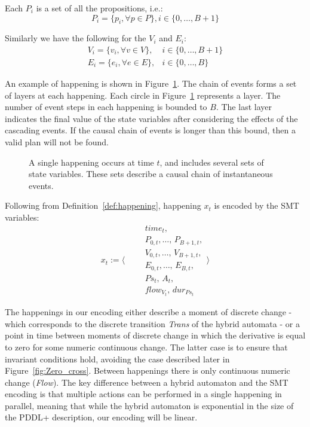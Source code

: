 Each $P_{i}$ is a set of all the propositions, i.e.:
$$
P_{i} = \{p_{i}, \forall p \in P\} , i\in \{0,\ldots, B+1\}
$$

Similarly we have the following for the $V_{i}$ and $E_{i}$:
$$
\begin{array}{cc}
V_{i} = \{v_{i}, \forall v \in V\}, & i\in \{0,\ldots, B+1\}\\
E_{i} = \{e_{i}, \forall e \in E\}, & i\in \{0,\ldots, B\}
\end{array}
$$

An example of happening is shown in Figure~\ref{fig:happening}. The chain of events forms a set of layers at each happening. Each circle in Figure~\ref{fig:happening} represents a layer. The number of event steps in each happening is bounded to $B$. The last layer indicates the final value of the state variables after considering the effects of the cascading events. If the causal chain of events is longer than this bound, then a valid plan will not be found.

\begin{figure}[ht]
\centering

\caption{A single happening occurs at time $t$, and includes several sets of state variables. These sets describe a causal chain of instantaneous events.}
\label{fig:happening}
\end{figure}

Following from Definition~\ref{def:happening}, happening $x_t$ is encoded by the SMT variables:
$$
x_t:=\Bigg \langle 
\begin{array}{l}
\qquad time_t,\\
\qquad P_{0,t},\ldots,\,P_{B+1,t},\\
\qquad V_{0,t},\ldots,\,V_{B+1,t},\\
\qquad E_{0,t},\ldots,\,E_{B,t},\\
\qquad Ps_t,\,A_t,\,\\
\qquad flow_{V_t},\,dur_{Ps_t}
\end{array}
\Bigg \rangle 
$$

The happenings in our encoding either describe a moment of discrete change -  which corresponds to the discrete transition \textit{Trans} of the hybrid automata - or a point in time between moments of discrete change in which the derivative is equal to zero for some numeric continuous change. The latter case is to ensure that invariant conditions hold, avoiding the case described later in Figure~\ref{fig:Zero_cross}. Between happenings there is only continuous numeric change (\textit{Flow}). The key difference between a hybrid automaton and the SMT encoding is that multiple actions can be performed in a single happening in parallel, meaning that while the hybrid automaton is exponential in the size of the PDDL+ description, our encoding will be linear.

